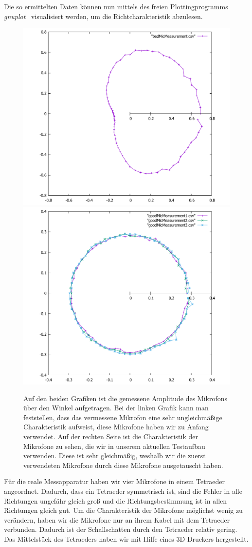 Die so ermittelten Daten können nun mittels des freien Plottingprogramms \textit{gnuplot}~\cite{Gnuplot} visualisiert werden, um die Richtcharakteristik abzulesen.
\begin{figure}[H]
  \centering
  \includegraphics[width=0.45\linewidth]{img/badMic}
  \includegraphics[width=0.45\linewidth]{img/goodMic}
  \caption{Auf den beiden Grafiken ist die gemessene Amplitude des Mikrofons über den Winkel aufgetragen. Bei der linken Grafik kann man feststellen, dass das vermessene Mikrofon eine sehr ungleichmäßige Charakteristik aufweist, diese Mikrofone haben wir zu Anfang verwendet. Auf der rechten Seite ist die Charakteristik der Mikrofone zu sehen, die wir in unserem aktuellen Testaufbau verwenden. Diese ist sehr gleichmäßig, weshalb wir die zuerst verwendeten Mikrofone durch diese Mikrofone ausgetauscht haben.}\label{fig:caracter}
\end{figure}
Für die reale Messapparatur haben wir vier Mikrofone in einem Tetraeder angeordnet. Dadurch, dass ein Tetraeder symmetrisch ist, sind die Fehler in alle Richtungen ungefähr gleich groß und die Richtungsbestimmung ist in allen Richtungen gleich gut. Um die Charakteristik der Mikrofone möglichst wenig zu verändern, haben wir die Mikrofone nur an ihrem Kabel mit dem Tetraeder verbunden. Dadurch ist der Schallschatten durch den Tetraeder relativ gering. Das Mittelstück des Tetraeders haben wir mit Hilfe eines 3D Druckers hergestellt.
